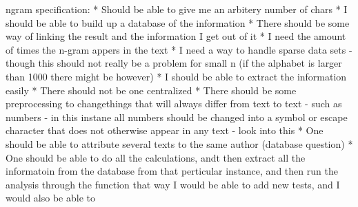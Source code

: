 ngram specification:
* Should be able to give me an arbitery number of chars
* I should be able to build up a database of the information
* There should be some way of linking the result and the information I get out of it
* I need the amount of times the n-gram appers in the text
* I need a way to handle sparse data sets - though this should not really be a problem for small n (if the alphabet is larger than 1000 there might be however)
* I should be able to extract the information easily
* There should not be one centralized 
* There should be some preprocessing to changethings that will always differ from text to text - such as numbers - in this instane all numbers should be changed into a symbol or escape character that does not otherwise appear in any text - look into this
* One should be able to attribute several texts to the same author (database question)
* One should be able to do all the calculations, andt then extract all the informatoin from the database from that perticular instance, and then run the analysis through the function that way I would be able to add new tests, and I would also be able to 
